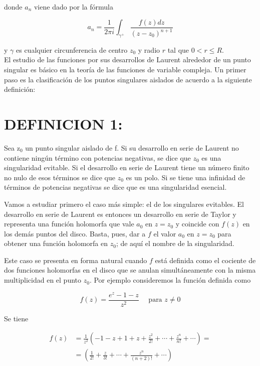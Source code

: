 \documentclass[10pt]{article}
\theoremstyle{plain}
\theoremstyle{definition}
\theoremstyle{remark}
\begin{document}
donde $a_{n}$ viene dado por la fórmula


\begin{equation*}
a_{n}=\frac{1}{2 \pi i} \int_{\gamma^{+}} \frac{f(z) d z}{\left(z-z_{0}\right)^{n+1}} \tag{17-2}
\end{equation*}


y $\gamma$ es cualquier circunferencia de centro $z_{0}$ y radio $r$ tal que $0<r \leqslant R$.\\
El estudio de las funciones por sus desarrollos de Laurent alrededor de un punto singular es básico en la teoría de las funciones de variable compleja. Un primer paso es la clasificación de los puntos singulares aislados de acuerdo a la siguiente definición:

\section*{DEFINICION 1:}
Sea $\mathrm{z}_{0}$ un punto singular aislado de f. Si su desarrollo en serie de Laurent no contiene ningún término con potencias negativas, se dice que $z_{0}$ es una singularidad evitable. Si el desarrollo en serie de Laurent tiene un número finito no nulo de esos términos se dice que $z_{0}$ es un polo. Si se tiene una infinidad de términos de potencias negativas se dice que es una singularidad esencial.

Vamos a estudiar primero el caso más simple: el de los singulares evitables. El desarrollo en serie de Laurent es entonces un desarrollo en serie de Taylor y representa una función holomorfa que vale $a_{0}$ en $z=z_{0}$ y coincide con $f(z)$ en los demás puntos del disco. Basta, pues, dar a $f$ el valor $a_{0}$ en $z=z_{0}$ para obtener una función holomorfa en $z_{0}$; de aquí el nombre de la singularidad.

Este caso se presenta en forma natural cuando $f$ está definida como el cociente de dos funciones holomorfas en el disco que se anulan simultáneamente con la misma multiplicidad en el punto $z_{0}$. Por ejemplo consideremos la función definida como

$$
f(z)=\frac{e^{z}-1-z}{z^{2}} \quad \text { para } z \neq 0
$$

Se tiene

$$
\begin{aligned}
f(z) & =\frac{1}{z^{2}}\left(-1-z+1+z+\frac{z^{2}}{2!}+\cdots+\frac{z^{n}}{n!}+\cdots\right)= \\
& =\left(\frac{1}{2!}+\frac{z}{3!}+\cdots+\frac{z^{n}}{(n+2)!}+\cdots\right)
\end{aligned}
$$
\end{document}
